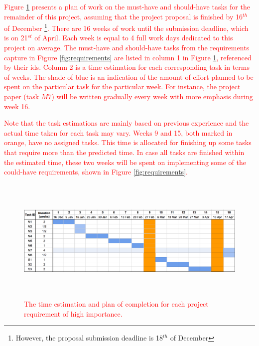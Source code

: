\documentclass{mprop}
\theoremstyle{definition}
\begin{document}
\textcolor{red}{
Figure \ref{fig:estimation} presents a plan of work on the must-have and should-have tasks for the remainder of this project, assuming that the project proposal is finished by 16$^{th}$ of December \footnote{However, the proposal submission deadline is 18$^{th}$ of December}. There are 16 weeks of work until the submission deadline, which is on 21$^{st}$ of April. Each week is equal to 4 full work days dedicated to this project on average. The must-have and should-have tasks from the requirements capture in Figure \ref{fig:requirements} are listed in column 1 in Figure \ref{fig:estimation}, referenced by their ids. Column 2 is a time estimation for each corresponding task in terms of weeks. The shade of blue is an indication of the amount of effort planned to be spent on the particular task for the particular week. For instance, the project paper (task $M7$) will be written gradually every week with more emphasis during week 16.}

\textcolor{red}{
Note that the task estimations are mainly based on previous experience and the actual time taken for each task may vary. Weeks 9 and 15, both marked in orange, have no assigned tasks. This time is allocated for finishing up some tasks that require more than the predicted time. In case all tasks are finished within the estimated time, these two weeks will be spent on implementing some of the could-have requirements, shown in Figure \ref{fig:requirements}.}

\begin{figure}
\centering
\caption{\textcolor{red}{The time estimation and plan of completion for each project requirement of high importance.}}
\label{fig:estimation}
\includegraphics[width=16cm, height=6cm]{images/estimation.png}
\end{figure}

\clearpage


\end{document}
